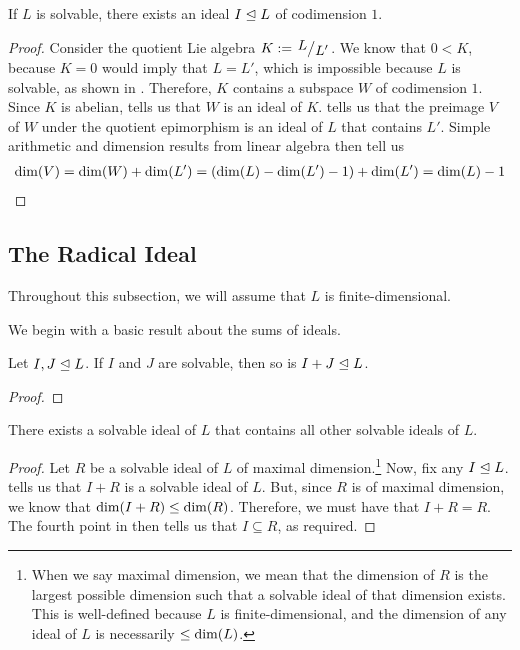 \begin{boxproposition}\label{Ch1:Prop:ExistsIdealCodim1}
If $L$ is solvable, there exists an ideal $I \trianglelefteq L$ of codimension $1$.
\end{boxproposition}
\begin{proof}
    Consider the quotient Lie algebra $K := \quotient{L}{L'}$. We know that $0 < K$, because $K = 0$ would imply that $L = L'$, which is impossible because $L$ is solvable, as shown in . Therefore, $K$ contains a subspace $W$ of codimension $1$. Since $K$ is abelian,  tells us that $W$ is an ideal of $K$.  tells us that the preimage $V$ of $W$ under the quotient epimorphism is an ideal of $L$ that contains $L'$. Simple arithmetic and dimension results from linear algebra then tell us
    \begin{align*}
        \dim\!\left( V \right) = \dim\!\left( W \right) + \dim\!\left( L' \right) = \left( \dim\!\left( L \right) - \dim\!\left( L' \right) - 1 \right) + \dim\!\left( L' \right) = \dim\!\left( L \right) - 1
    \end{align*}
\end{proof}

\subsection{The Radical Ideal}

Throughout this subsection, we will assume that $L$ is finite-dimensional.

We begin with a basic result about the sums of ideals.

\begin{lemma}\label{Ch1:Lemma:SumIdealSolvable}
    Let $I, J \trianglelefteq L$. If $I$ and $J$ are solvable, then so is $I + J \trianglelefteq L$.
\end{lemma}
\begin{proof}
    \sorry
\end{proof}

\begin{boxcorollary}\label{Ch1:Cor:RadExists}
    There exists a solvable ideal of $L$ that contains all other solvable ideals of $L$.
\end{boxcorollary}
\begin{proof}
    Let $R$ be a solvable ideal of $L$ of maximal dimension.\footnote{When we say maximal dimension, we mean that the dimension of $R$ is the largest possible dimension such that a solvable ideal of that dimension exists. This is well-defined because $L$ is finite-dimensional, and the dimension of any ideal of $L$ is necessarily $\leq \dim\!\left( L \right)$.} Now, fix any $I \trianglelefteq L$.  tells us that $I + R$ is a solvable ideal of $L$. But, since $R$ is of maximal dimension, we know that $\dim\!\left( I + R \right) \leq \dim\!\left( R \right)$. Therefore, we must have that $I + R = R$. The fourth point in  then tells us that $I \subseteq R$, as required.
\end{proof}

